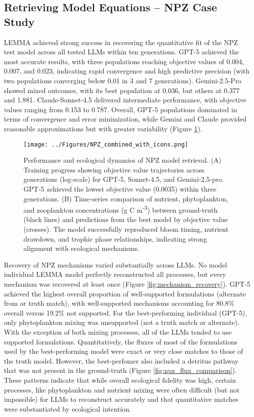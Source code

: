 \subsection{Retrieving Model Equations -- NPZ Case Study}


LEMMA achieved strong success in recovering the quantitative fit of the NPZ test model across all tested LLMs within ten generations. GPT-5 achieved the most accurate results, with three populations reaching objective values of 0.004, 0.007, and 0.023, indicating rapid convergence and high predictive precision (with two populations converging below 0.01 in 3 and 7 generations). Gemini-2.5-Pro showed mixed outcomes, with its best population at 0.036, but others at 0.377 and 1.881. Claude-Sonnet-4.5 delivered intermediate performance, with objective values ranging from 0.153 to 0.787. Overall, GPT-5 populations dominated in terms of convergence and error minimization, while Gemini and Claude provided reasonable approximations but with greater variability (Figure \ref{fig:npz_timeseries}).


\begin{figure}[H]
\centering
\texttt{[image: ../Figures/NPZ\_combined\_with\_icons.png]}
\caption{Performance and ecological dynamics of NPZ model retrieval. (A) Training progress showing objective value trajectories across generations (log-scale) for GPT-5, Sonnet-4.5, and Gemini-2.5-pro. GPT-5 achieved the lowest objective value (0.0035) within three generations. (B) Time-series comparison of nutrient, phytoplankton, and zooplankton concentrations (g C m\textsuperscript{-3}) between ground-truth (black lines) and predictions from the best model by objective value (crosses). The model successfully reproduced bloom timing, nutrient drawdown, and trophic phase relationships, indicating strong alignment with ecological mechanisms.}
\label{fig:npz_timeseries}
\end{figure}

Recovery of NPZ mechanisms varied substantially across LLMs. No model individual LEMMA model perfectly reconstructed all processes, but every mechanism was recovered at least once (Figure \ref{fig:mechanism_recovery}). GPT-5 achieved the highest overall proportion of well-supported formulations (alternate from \cite{franks2002npz} or truth match), with well-supported mechanisms accounting for 80.8\% overall versus 19.2\% not supported. For the best-performing individual (GPT-5), only phytoplankton mixing was unsupported (not a truth match or alternate). With the exception of both mixing processes, all of the LLMs tended to use supported formulations. Quantitatively, the fluxes of most of the formulations used by the best-performing model were exact or very close matches to those of the truth model. However, the best-perfomer also included a detritus pathway that was not present in the ground-truth (Figure \ref{fig:npz_flux_comparison}). These patterns indicate that while overall ecological fidelity was high, certain processes, like phytoplankton and nutrient mixing were often difficult (but not impossible) for LLMs to reconstruct accurately and that quantitative matches were substantiated by ecological intention.



